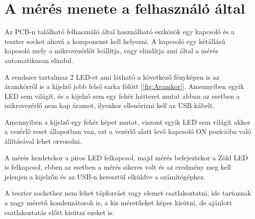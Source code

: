 \section{A mérés menete a felhasználó által}

Az PCB-n található felhasználó által használható eszközök egy kapcsoló és a 
teszter socket ahová a komponenst kell helyezni. A kapcsoló egy kétállású
kapcsoló mely a mikrovezérlőt leállítja, vagy elindítja ami által a mérés
automatikusan elindul.

A rendszer tartalmaz 2 LED-et ami látható a következő fényképen is az
áramkörről is a kijelző jobb felső sarka fölött [\ref{fig:Aramkor}]. 
Amennyiben egyik LED sem világít, és a kijelző sem egy fehér hátteret
mutat abban az esetben a mikrovezérlő nem kap áramot, ilyenkor ellenőrizni
kell az USB kábelt.

Amennyiben a kijelző egy fehér képet mutat, viszont egyik LED sem világít akkor
a vezérlő reset állapotban van, ezt a vezérlő alatt levő kapcsoló ON 
pozícióba való állításával lehet orvosolni.

A mérés kezdetekor a piros LED felkapcsol, majd mérés befejeztekor a Zöld 
LED is felkapcsol, ebben az esetben a mérés sikeres volt és az eredmény meg 
kell jelenjen a kijelzőn és az USB-n keresztül elküldve a számítógéphez.

A teszter sockethez nem lehet tápforrást vagy elemet csatlakoztatni, ide tartoznak
a nagy méretű kondenzátorok is, a kis méretűeket képes kisütni, de ajánlott 
csatlakoztatás előtt kisütni ezeket is.

